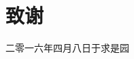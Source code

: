 \chapter{致\ZJUspace{}谢}



\vspace{2cm}
\hfill
\begin{minipage}{14em}
    \begin{flushright}
      $\quad$\\
      二零一六年四月八日于求是园\\ %
    \end{flushright}
\end{minipage}
